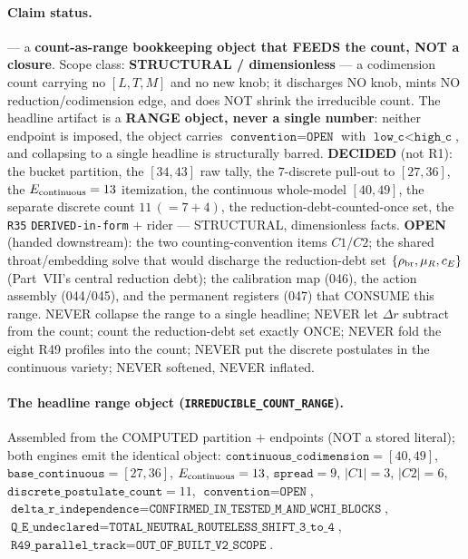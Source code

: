 \paragraph{Claim status.}
\StatusOpen{} --- a \textbf{count-as-range bookkeeping object that FEEDS the count,
NOT a closure}. Scope class: \textbf{STRUCTURAL / dimensionless} --- a codimension
count carrying no \([L,T,M]\) and no new knob; it discharges NO knob, mints NO
reduction/codimension edge, and does NOT shrink the irreducible count. The headline
artifact is a \textbf{RANGE object, never a single number}: neither endpoint is
imposed, the object carries \(\texttt{convention}=\texttt{OPEN}\) with
\(\texttt{low\_c}<\texttt{high\_c}\), and collapsing to a single headline is
structurally barred. \textbf{DECIDED} (not R1): the bucket partition, the
\([34,43]\) raw tally, the \(7\)-discrete pull-out to \([27,36]\), the
\(E_{\rm continuous}=13\) itemization, the continuous whole-model \([40,49]\), the
separate discrete count \(11\,(=7+4)\), the reduction-debt-counted-once set, the
\texttt{R35} \texttt{DERIVED-in-form} \(+\) rider --- STRUCTURAL, dimensionless
facts. \textbf{OPEN} (handed downstream): the two counting-convention items
\(C1\)/\(C2\); the shared throat/embedding solve that would discharge the
reduction-debt set \(\{\rho_{\rm br},\mu_R,c_E\}\) (Part~VII's central reduction
debt); the calibration map (046), the action assembly (044/045), and the permanent
registers (047) that CONSUME this range. NEVER collapse the range to a single
headline; NEVER let \(\Delta r\) subtract from the count; count the reduction-debt
set exactly ONCE; NEVER fold the eight R49 profiles into the count; NEVER put the
discrete postulates in the continuous variety; NEVER softened, NEVER inflated.

\paragraph{The headline range object (\texttt{IRREDUCIBLE\_COUNT\_RANGE}).}
Assembled from the COMPUTED partition \(+\) endpoints (NOT a stored literal); both
engines emit the identical object:
\(\texttt{continuous\_codimension}=[40,49]\),
\(\texttt{base\_continuous}=[27,36]\), \(E_{\rm continuous}=13\),
\(\texttt{spread}=9\), \(|C1|=3\), \(|C2|=6\),
\(\texttt{discrete\_postulate\_count}=11\), \(\texttt{convention}=\texttt{OPEN}\),
\(\texttt{delta\_r\_independence}=\texttt{CONFIRMED\_IN\_TESTED\_M\_AND\_WCHI\_BLOCKS}\),
\(\texttt{Q\_E\_undeclared}=\texttt{TOTAL\_NEUTRAL\_ROUTELESS\_SHIFT\_3\_to\_4}\),
\(\texttt{R49\_parallel\_track}=\texttt{OUT\_OF\_BUILT\_V2\_SCOPE}\).

